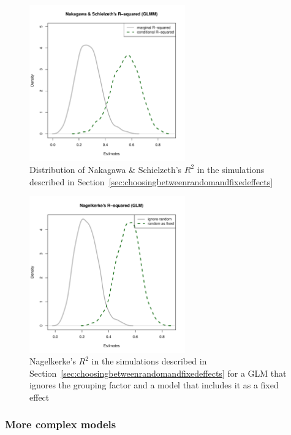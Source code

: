 \documentclass[a4paper,12pt]{article}
\begin{document}
\begin{figure}[!htpb]
  \centering
  \includegraphics[width=0.6\textwidth]{graphics/rsqglmmj5i20}
  \caption{Distribution of Nakagawa \& Schielzeth's $R^2$ in the simulations described in Section~\ref{sec:choosingbetweenrandomandfixedeffects}}
  \label{fig:rsqglmmj5i20}
\end{figure}

\begin{figure}[!htpb]
  \centering
  \includegraphics[width=0.6\textwidth]{graphics/rsqglmj5i20}
  \caption{Nagelkerke's $R^2$ in the simulations described in Section~\ref{sec:choosingbetweenrandomandfixedeffects} for a GLM that ignores the grouping factor and a model that includes it as a fixed effect}
  \label{fig:rsqglmj5i20}
\end{figure}

\subsubsection{More complex models}
\label{sec:morecomplexmodels}
\end{document}
